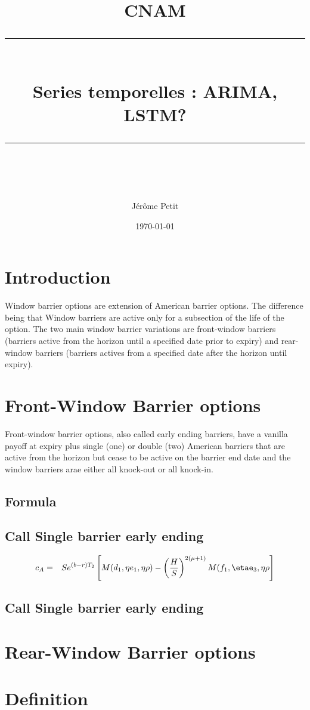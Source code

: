 \documentclass[11pt]{scrartcl} %
\title{	
	\normalfont\normalsize
	\textsc{CNAM}\\ %
	\vspace{25pt} %
	\rule{\linewidth}{0.5pt}\\ %
	\vspace{20pt} %
	{\huge Series temporelles : ARIMA, LSTM?}\\ %
	\vspace{12pt} %
	\rule{\linewidth}{2pt}\\ %
	\vspace{12pt} %
}
\author{\LARGE Jérôme Petit} %
\date{\normalsize\today} %
\begin{document}
\maketitle %

%
\section{Introduction}
Window barrier options are extension of American barrier options. The difference being that Window barriers are active only for a subsection of the life of the option. The two main window barrier variations are front-window barriers (barriers active from the horizon until a specified date prior to expiry) and rear-window barriers (barriers actives from a specified date after the horizon until expiry).
\section{Front-Window Barrier options}
Front-window barrier options, also called early ending barriers, have a vanilla payoff at expiry plus single (one) or double (two) American barriers that are active from the horizon but cease to be active on the barrier end date and  the window barriers arae either all knock-out or all knock-in.
\subsection{Formula}
\subsection{Call Single barrier early ending}
\begin{eqnarray}
c_A &=& Se^{(b-r)T_2}\left[M(d_1,\eta e_1,\eta\rho)-\left(\frac{H}{S}\right)^{2(\mu+1)}M(f_1,\etae_3,\eta\rho\right]
\end{eqnarray}
\subsection{Call Single barrier early ending}
\section{Rear-Window Barrier options}
\section{Definition}


\end{document}

